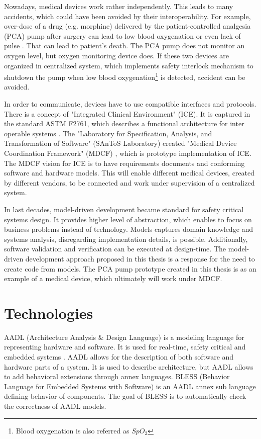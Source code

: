 Nowadays, medical devices work rather independently. This leads to many accidents, which could have been avoided by their interoperability. For example, over-dose of a drug (e.g. morphine) delivered by the patient-controlled analgesia (PCA) pump after surgery can lead to low blood oxygenation or even lack of pulse \cite{RespiratoryDepression:Article}. That can lead to patient's death. The PCA pump does not monitor an oxygen level, but oxygen monitoring device does. If these two devices are organized in centralized system, which implements safety interlock mechanism to shutdown the pump when low blood oxygenation\footnote{Blood oxygenation is also referred as $SpO_{2}$} is detected, accident can be avoided. 

In order to communicate, devices have to use compatible interfaces and protocols. There is a concept of "Integrated Clinical Environment" (ICE). It is captured in the standard ASTM F2761, which describes a functional architecture for inter operable systems \cite{MedicalApplicationPlatforms:Paper}. The "Laboratory for Specification, Analysis, and Transformation of Software" (SAnToS Laboratory) created "Medical Device Coordination Framework" (MDCF) \cite{MedicalApplicationPlatforms:Paper}, which is prototype implementation of ICE. The MDCF vision for ICE is to have requirements documents and conforming software and hardware models. This will enable different medical devices, created by different vendors, to be connected and work under supervision of a centralized system.

In last decades, model-driven development \cite{ModelDrivenDevelopmentBook} became standard for safety critical systems design. It provides higher level of abstraction, which enables to focus on business problems instead of technology. Models captures domain knowledge and systems analysis, disregarding implementation details, is possible. Additionally, software validation and verification can be executed at design-time. The model-driven development approach proposed in this thesis is a response for the need to create code from models. The PCA pump prototype created in this thesis is as an example of a medical device, which ultimately will work under MDCF.


\section{Technologies}
\label{introduction:technologies}

AADL (Architecture Analysis \& Design Language) \cite{AadlBook} is a modeling language for representing hardware and software. It is used for real-time, safety critical and embedded systems \cite{AADL:Paper}. AADL allows for the description of both software and hardware parts of a system. It is used to describe architecture, but AADL allows to add behavioral extensions through annex languages. BLESS (Behavior Language for Embedded Systems with Software) \cite{Bless:Paper} is an AADL annex sub language defining behavior of components. The goal of BLESS is to automatically check the correctness of AADL models.

